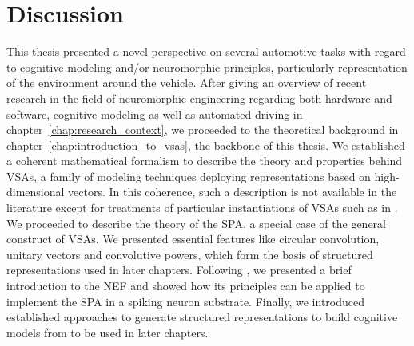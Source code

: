 \chapter{Discussion}%
\label{chap:discussion}

This thesis presented a novel perspective on several automotive tasks with regard to cognitive modeling and/or neuromorphic principles, particularly representation of the environment around the vehicle.
After giving an overview of recent research in the field of neuromorphic engineering regarding both hardware and software, cognitive modeling as well as automated driving in chapter~\ref{chap:research_context}, we proceeded to the theoretical background in chapter~\ref{chap:introduction_to_vsas}, the backbone of this thesis.
We established a coherent mathematical formalism to describe the theory and properties behind \acp{VSA}, a family of modeling techniques deploying representations based on high-dimensional vectors.
In this coherence, such a description is not available in the literature except for treatments of particular instantiations of \acp{VSA} such as in \textcites{Plate1994}{Gayler1998}{Kanerva2009}.
We proceeded to describe the theory of the \ac{SPA}, a special case of the general construct of \acp{VSA}.
We presented essential features like circular convolution, unitary vectors and convolutive powers, which form the basis of structured representations used in later chapters.
Following \textcite{Eliasmith2003}, we presented a brief introduction to the \ac{NEF} and showed how its principles can be applied to implement the \ac{SPA} in a spiking neuron substrate.
Finally, we introduced established approaches to generate structured representations to build cognitive models from to be used in later chapters.

